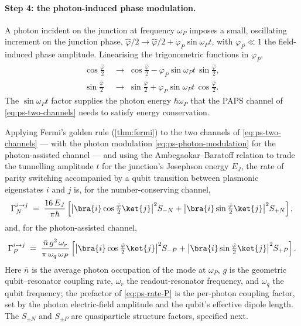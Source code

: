 \paragraph{Step 4: the photon-induced phase modulation.}
A photon incident on the junction at frequency $\omega_P$ imposes a
small, oscillating increment on the junction phase,
$\hat\varphi/2 \to \hat\varphi/2 + \varphi_P\sin\omega_P t$, with
$\varphi_P\ll 1$ the field-induced phase amplitude. Linearising the
trigonometric functions in $\varphi_P$,
\begin{equation}
\label{eq:ps-photon-modulation}
\begin{aligned}
\cos\tfrac{\hat\varphi}{2}
&\;\to\; \cos\tfrac{\hat\varphi}{2}
- \varphi_P\sin\omega_P t\,\sin\tfrac{\hat\varphi}{2},\\
\sin\tfrac{\hat\varphi}{2}
&\;\to\; \sin\tfrac{\hat\varphi}{2}
+ \varphi_P\sin\omega_P t\,\cos\tfrac{\hat\varphi}{2}.
\end{aligned}
\end{equation}
The $\sin\omega_P t$ factor supplies the photon energy
$\hbar\omega_P$ that the PAPS channel of
\cref{eq:ps-two-channels} needs to satisfy energy conservation.

\begin{statement}
\label{stmt:parity-rates}
Applying Fermi's golden rule (\cref{thm:fermi}) to the two channels
of \cref{eq:ps-two-channels} --- with the photon modulation
\cref{eq:ps-photon-modulation} for the photon-assisted channel ---
and using the Ambegaokar--Baratoff relation to trade the tunnelling
amplitude $t$ for the junction's Josephson energy $E_J$, the rate
of parity switching accompanied by a qubit transition between
plasmonic eigenstates $i$ and $j$ is, for the number-conserving
channel,
\begin{equation}
\label{eq:ps-rate-N}
\Gamma_N^{i\to j}
\;=\; \frac{16\,E_J}{\pi\hbar}
\left[
\bigl|\bra{i}\cos\tfrac{\hat\varphi}{2}\ket{j}\bigr|^2 S_{-N}
+ \bigl|\bra{i}\sin\tfrac{\hat\varphi}{2}\ket{j}\bigr|^2 S_{+N}
\right],
\end{equation}
and, for the photon-assisted channel,
\begin{equation}
\label{eq:ps-rate-P}
\Gamma_P^{i\to j}
\;=\; \frac{\bar n\,g^2\,\omega_r}{\pi\,\omega_q\,\omega_P}
\left[
\bigl|\bra{i}\cos\tfrac{\hat\varphi}{2}\ket{j}\bigr|^2 S_{-P}
+ \bigl|\bra{i}\sin\tfrac{\hat\varphi}{2}\ket{j}\bigr|^2 S_{+P}
\right].
\end{equation}
Here $\bar n$ is the average photon occupation of the mode at
$\omega_P$, $g$ is the geometric qubit--resonator coupling rate,
$\omega_r$ the readout-resonator frequency, and $\omega_q$ the
qubit frequency; the prefactor of \cref{eq:ps-rate-P} is the
per-photon coupling factor, set by the photon electric-field
amplitude and the qubit's effective dipole length. The
$S_{\pm N}$ and $S_{\pm P}$ are quasiparticle structure factors,
specified next.
\end{statement}

